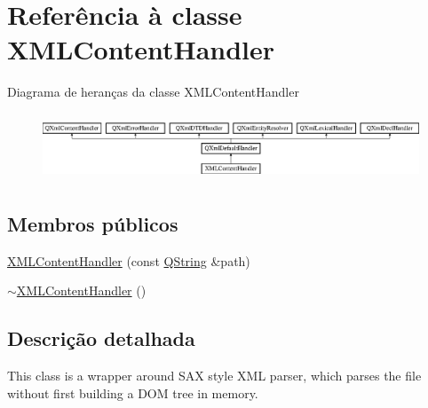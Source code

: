 \hypertarget{class_x_m_l_content_handler}{\section{Referência à classe X\-M\-L\-Content\-Handler}
\label{class_x_m_l_content_handler}
}
Diagrama de heranças da classe X\-M\-L\-Content\-Handler\begin{figure}[H]
\begin{center}
\leavevmode
\includegraphics[height=2.014389cm]{class_x_m_l_content_handler}
\end{center}
\end{figure}
\subsection*{Membros públicos}
\begin{DoxyCompactItemize}
\item 
\hyperlink{class_x_m_l_content_handler_aa0555ce9279f2808bb3f5e0e6cf24533}{X\-M\-L\-Content\-Handler} (const \hyperlink{class_q_string}{Q\-String} \&path)
\item 
\hyperlink{class_x_m_l_content_handler_a2936432fd89c77d36979581392e462ab}{$\sim$\-X\-M\-L\-Content\-Handler} ()
\end{DoxyCompactItemize}


\subsection{Descrição detalhada}
This class is a wrapper around S\-A\-X style X\-M\-L parser, which parses the file without first building a D\-O\-M tree in memory. 

